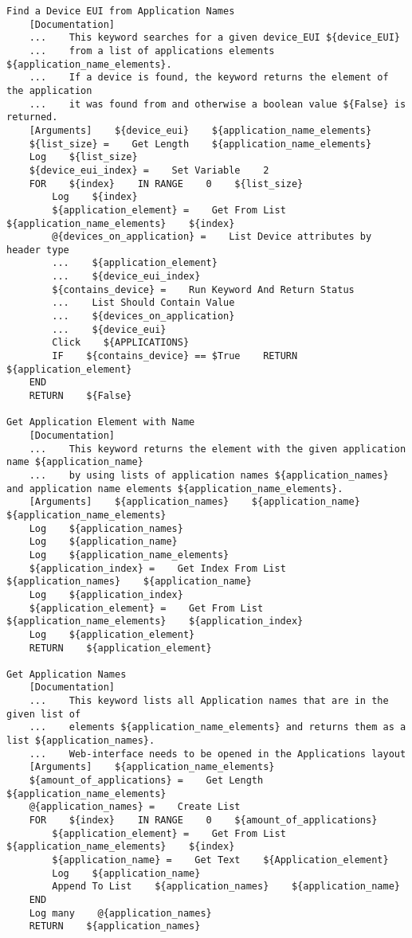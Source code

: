\begin{verbatim}
Find a Device EUI from Application Names
    [Documentation]
    ...    This keyword searches for a given device_EUI ${device_EUI}
    ...    from a list of applications elements ${application_name_elements}.
    ...    If a device is found, the keyword returns the element of the application
    ...    it was found from and otherwise a boolean value ${False} is returned.
    [Arguments]    ${device_eui}    ${application_name_elements}
    ${list_size} =    Get Length    ${application_name_elements}
    Log    ${list_size}
    ${device_eui_index} =    Set Variable    2
    FOR    ${index}    IN RANGE    0    ${list_size}
        Log    ${index}
        ${application_element} =    Get From List    ${application_name_elements}    ${index}
        @{devices_on_application} =    List Device attributes by header type
        ...    ${application_element}
        ...    ${device_eui_index}
        ${contains_device} =    Run Keyword And Return Status
        ...    List Should Contain Value
        ...    ${devices_on_application}
        ...    ${device_eui}
        Click    ${APPLICATIONS}
        IF    ${contains_device} == $True    RETURN    ${application_element}
    END
    RETURN    ${False}

Get Application Element with Name
    [Documentation]
    ...    This keyword returns the element with the given application name ${application_name}
    ...    by using lists of application names ${application_names} and application name elements ${application_name_elements}.
    [Arguments]    ${application_names}    ${application_name}    ${application_name_elements}
    Log    ${application_names}
    Log    ${application_name}
    Log    ${application_name_elements}
    ${application_index} =    Get Index From List    ${application_names}    ${application_name}
    Log    ${application_index}
    ${application_element} =    Get From List    ${application_name_elements}    ${application_index}
    Log    ${application_element}
    RETURN    ${application_element}

Get Application Names
    [Documentation]
    ...    This keyword lists all Application names that are in the given list of
    ...    elements ${application_name_elements} and returns them as a list ${application_names}.
    ...    Web-interface needs to be opened in the Applications layout
    [Arguments]    ${application_name_elements}
    ${amount_of_applications} =    Get Length    ${application_name_elements}
    @{application_names} =    Create List
    FOR    ${index}    IN RANGE    0    ${amount_of_applications}
        ${application_element} =    Get From List    ${application_name_elements}    ${index}
        ${application_name} =    Get Text    ${Application_element}
        Log    ${application_name}
        Append To List    ${application_names}    ${application_name}
    END
    Log many    @{application_names}
    RETURN    ${application_names}


\end{verbatim}

